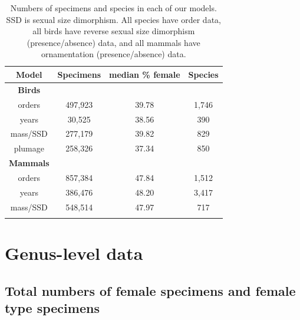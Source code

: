 \documentclass[a4paper, 12pt]{article}
\begin{document}
\begin{table}[H]
\begin{tabular}{cccc}

  \hline
  \textbf{Model} & \textbf{Specimens} & \textbf{median \% female} & \textbf{Species}\\ 
  \hline
  \textbf{Birds} & & &\\
  \hline
  orders & 497,923 & 39.78 & 1,746\\
  years & 30,525 & 38.56 & 390\\
  mass/SSD & 277,179 & 39.82 & 829\\
  plumage & 258,326 & 37.34 & 850\\
  \hline
  \textbf{Mammals} &&&\\
  \hline
  orders & 857,384 & 47.84 & 1,512\\
  years & 386,476 & 48.20 & 3,417\\
  mass/SSD & 548,514 & 47.97 & 717\\
  \hline

\label{table_numbers}
\end{tabular}
\caption{Numbers of specimens and species in each of our models. SSD is sexual size dimorphism. All species have order data, all birds have reverse sexual size dimorphism (presence/absence) data, and all mammals have ornamentation (presence/absence) data.} 

\end{table}

\newpage
\section{Genus-level data}



\newpage
\subsection*{Total numbers of female specimens and female type specimens}
\end{document}
